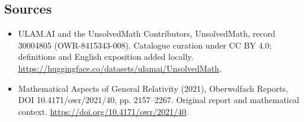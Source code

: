\documentclass[11pt]{article}
\begin{document}
\subsection{Sources}
\begin{itemize}
\item[\hypertarget{source:30004805:1}{S1}] ULAM.AI and the UnsolvedMath Contributors, UnsolvedMath, record 30004805 (OWR-8415343-008). Catalogue curation under CC BY 4.0; definitions and English exposition added locally.
\url{https://huggingface.co/datasets/ulamai/UnsolvedMath}.
\item[\hypertarget{source:30004805:2}{S2}] Mathematical Aspects of General Relativity (2021), Oberwolfach Reports, DOI 10.4171/owr/2021/40, pp. 2157--2267. Original report and mathematical context.
\url{https://doi.org/10.4171/owr/2021/40}.
\end{itemize}
\label{end:30004805}
\end{document}
